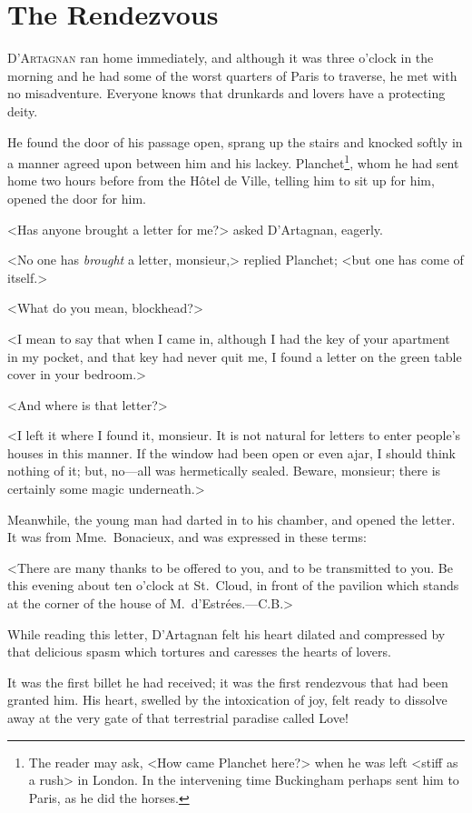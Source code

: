 
\chapter{The Rendezvous} 
	
\lettrine{D}{'Artagnan} ran home immediately, and although it was three o'clock in the morning and he had some of the worst quarters of Paris to traverse, he met with no misadventure. Everyone knows that drunkards and lovers have a protecting deity. 

He found the door of his passage open, sprang up the stairs and knocked softly in a manner agreed upon between him and his lackey. Planchet\footnote{The reader may ask, <How came Planchet here?> when he was left <stiff as a rush> in London. In the intervening time Buckingham perhaps sent him to Paris, as he did the horses.}, whom he had sent home two hours before from the Hôtel de Ville, telling him to sit up for him, opened the door for him. 

<Has anyone brought a letter for me?> asked D'Artagnan, eagerly. 

<No one has \emph{brought} a letter, monsieur,> replied Planchet; <but one has come of itself.> 

<What do you mean, blockhead?> 

<I mean to say that when I came in, although I had the key of your apartment in my pocket, and that key had never quit me, I found a letter on the green table cover in your bedroom.> 

<And where is that letter?> 

<I left it where I found it, monsieur. It is not natural for letters to enter people's houses in this manner. If the window had been open or even ajar, I should think nothing of it; but, no—all was hermetically sealed. Beware, monsieur; there is certainly some magic underneath.> 

Meanwhile, the young man had darted in to his chamber, and opened the letter. It was from Mme.~Bonacieux, and was expressed in these terms: 

<There are many thanks to be offered to you, and to be transmitted to you. Be this evening about ten o'clock at St.~Cloud, in front of the pavilion which stands at the corner of the house of M.~d'Estrées.—C.B.> 

While reading this letter, D'Artagnan felt his heart dilated and compressed by that delicious spasm which tortures and caresses the hearts of lovers. 

It was the first billet he had received; it was the first rendezvous that had been granted him. His heart, swelled by the intoxication of joy, felt ready to dissolve away at the very gate of that terrestrial paradise called Love! 

